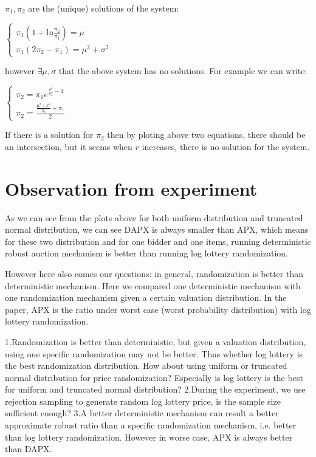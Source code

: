 $\pi_1, \pi_2$ are the (unique) solutions of the system: 
\begin{center}
	$\begin{cases} \pi_1 (1 + \text{ln}\frac{\pi_2}{\pi_1}) = \mu   \\    \pi_1(2\pi_2 - \pi_1) = \mu^2 + \sigma^2  \end{cases}$
\end{center}

however $\exists \mu, \sigma$ that the above system has no solutions. For example we can write:

\begin{center}
	$\begin{cases} \pi_2 = \pi_1 e^{\frac{\mu}{\pi_1}-1}   \\  \pi_2= \frac{\frac{\mu^2 + \sigma^2 }{\pi_1} +\pi_1}{2}  \end{cases}$
\end{center}

If there is a solution for $\pi_2$ then by ploting above two equations, there should be an intersection, but it seems when $r$ increases, there is no solution for the system. \\

\section{Observation from experiment}

As we can see from the plots above for both uniform distribution and truncated normal distribution, we can see DAPX is always smaller than APX, which means for these two distribution and for one bidder and one items, running deterministic robust auction mechanism is better than running log lottery randomization.

However here also comes our questions: in general, randomization is better than deterministic mechanism. Here we compared one deterministic mechanism with one randomization mechanism given a certain valuation distribution. In the paper, APX is the ratio under worst case (worst probability distribution) with log lottery randomization. 

1.Randomization is better than deterministic, but given a valuation distribution, using one specific randomization may not be better. Thus whether log lottery is the best randomization distribution. How about using uniform or truncated normal distribution for price randomization? Especially is log lottery is the best for uniform and truncated normal distribution?
2.During the experiment, we use rejection sampling to generate random log lottery price, is the sample size sufficient enough?
3.A better deterministic mechanism can result a better approximate robust ratio than a specific randomization mechanism, i.e. better than log lottery randomization. However in worse case, APX is always better than DAPX. 


